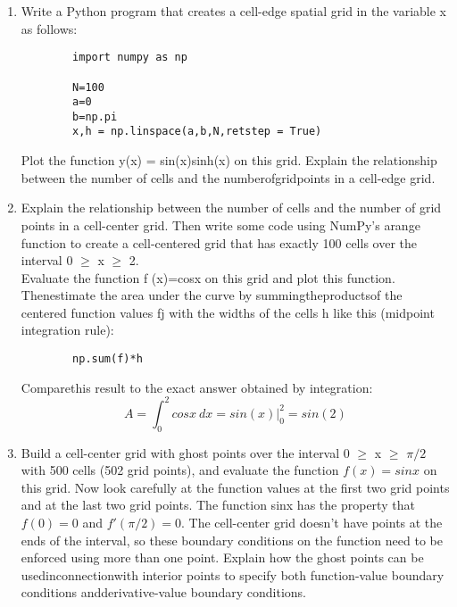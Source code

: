       \begin{problem} \label{P1.2}
    \begin{enumerate}[label=(\alph*)]
    
      \item  Write a Python program that creates a cell-edge spatial grid in the variable x as follows: 
      \begin{lstlisting}
      	import numpy as np
      	
      	N=100
      	a=0
      	b=np.pi
      	x,h = np.linspace(a,b,N,retstep = True)
 		\end{lstlisting}
      Plot the function y(x) = sin(x)sinh(x) on this grid. Explain the relationship between the number of cells and the numberofgridpoints in a cell-edge grid.

    
     
      \item     Explain the relationship between the number of cells and the number of grid points in a cell-center grid. Then write some code using NumPy\rq s arange function to create a cell-centered grid that has exactly 100 cells over the interval 0	$\geq$ x 	$\geq$ 2. 
           \\Evaluate the function f (x)=cosx on this grid and plot this function. Thenestimate the area under the curve by summingtheproductsof the centered function values fj with the widths of the cells h like this (midpoint integration rule):
      
      \begin{lstlisting}
      	np.sum(f)*h
      \end{lstlisting}
      
      Comparethis result to the exact answer obtained by integration: 
      \\      \[A = \int_0^2 cosx \ dx = sin(x) \vert_0^2 = sin(2) \]          
       
\item Build a cell-center grid with ghost points over the interval 0 $\geq$ x $\geq$ $\pi/2$ with 500 cells (502 grid points), and evaluate the function $f (x)=sinx$ on this grid. Now look carefully at the function values at the first two grid points and at the last two grid points. The function sinx has the property that $f(0) = 0$ and $f\prime(\pi/2) = 0$. The cell-center grid doesn\rq t have points at the ends of the interval, so these boundary conditions on the function need to be enforced using more than one point. Explain how the ghost points can be usedinconnectionwith interior points to specify both function-value boundary conditions andderivative-value boundary conditions.	    
    \end{enumerate}  
  \end{problem}
    
